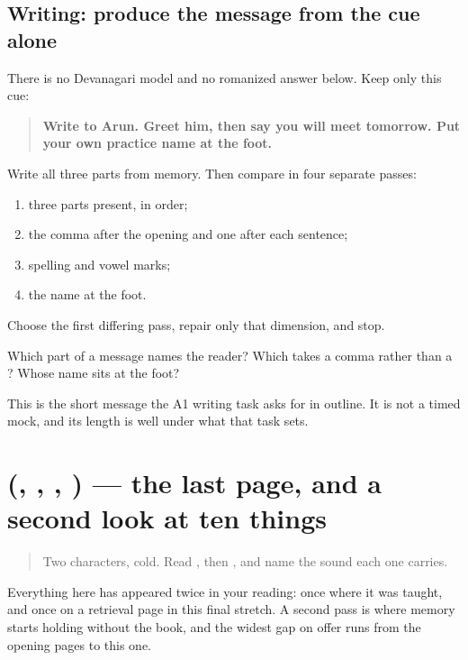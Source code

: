 \subsection*{Writing: produce the message from the cue alone}
There is no Devanagari model and no romanized answer below. Keep only this cue:

\begin{quote}
\textbf{Write to Arun. Greet him, then say you will meet tomorrow. Put your own practice name at the foot.}
\end{quote}

Write all three parts from memory. Then compare in four separate passes:

\begin{enumerate}
\raggedright
  \item three parts present, in order;
  \item the comma after the opening and one \textbf{} after each sentence;
  \item spelling and vowel marks;
  \item the name at the foot.
\end{enumerate}

Choose the first differing pass, repair only that dimension, and stop.

\begin{tcolorbox}[breakable,colback=teal!4,colframe=teal!35!black,title={Before you move on}]
Which part of a message names the reader? Which takes a comma rather than a \textbf{}? Whose name sits at the foot?

This is the short message the A1 writing task asks for in outline. It is not a timed mock, and its length is well under what that task sets.
\end{tcolorbox}
\section[\texorpdfstring{(\hi{स}, \hi{ऋ}, \hi{चादर}, \hi{खाना})}{(स, ऋ, चादर, खाना)}]{(, , , ) — the last page, and a second look at ten things}

\label{lesson:HI-R105-the-last-page}



\begin{quote}
Two characters, cold. Read \textbf{}, then \textbf{}, and name the sound each one carries.
\end{quote}

\begin{grammarlens}[title={What you've built, and what this page does with it}]
Everything here has appeared twice in your reading: once where it was taught, and once on a retrieval page in this final stretch. A second pass is where memory starts holding without the book, and the widest gap on offer runs from the opening pages to this one.
\end{grammarlens}


